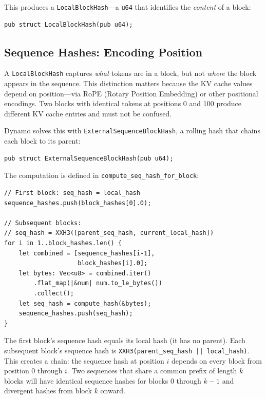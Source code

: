 This produces a \texttt{LocalBlockHash}---a \texttt{u64} that identifies the \emph{content} of a block:

\begin{verbatim}
pub struct LocalBlockHash(pub u64);
\end{verbatim}

\subsection{Sequence Hashes: Encoding Position}

%
A \texttt{LocalBlockHash} captures \emph{what} tokens are in a block, but not \emph{where} the block appears in the sequence. This distinction matters because the KV cache values depend on position---via RoPE (Rotary Position Embedding) or other positional encodings. Two blocks with identical tokens at positions 0 and 100 produce different KV cache entries and must not be confused.

Dynamo solves this with \texttt{ExternalSequenceBlockHash}, a rolling hash that chains each block to its parent:

\begin{verbatim}
pub struct ExternalSequenceBlockHash(pub u64);
\end{verbatim}

The computation is defined in \texttt{compute\_seq\_hash\_for\_block}:

\begin{verbatim}
// First block: seq_hash = local_hash
sequence_hashes.push(block_hashes[0].0);

// Subsequent blocks:
// seq_hash = XXH3([parent_seq_hash, current_local_hash])
for i in 1..block_hashes.len() {
    let combined = [sequence_hashes[i-1],
                    block_hashes[i].0];
    let bytes: Vec<u8> = combined.iter()
        .flat_map(|&num| num.to_le_bytes())
        .collect();
    let seq_hash = compute_hash(&bytes);
    sequence_hashes.push(seq_hash);
}
\end{verbatim}

The first block's sequence hash equals its local hash (it has no parent). Each subsequent block's sequence hash is \texttt{XXH3(parent\_seq\_hash || local\_hash)}. This creates a chain: the sequence hash at position $i$ depends on every block from position 0 through $i$. Two sequences that share a common prefix of length $k$ blocks will have identical sequence hashes for blocks $0$ through $k-1$ and divergent hashes from block $k$ onward.

